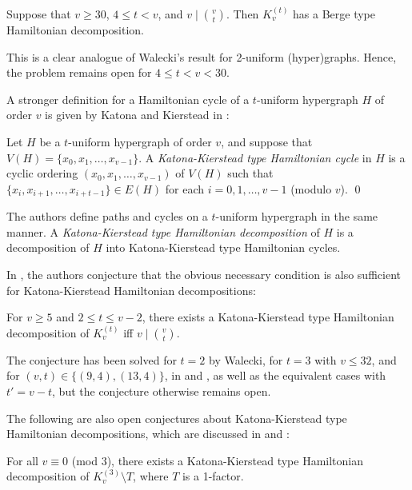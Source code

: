 \begin{theorem} \label{berge-hamilton2}
Suppose that $v \geq 30$, $4 \leq t < v$, and $v \mid {v \choose t}$. Then
$K_v^{(t)}$ has a Berge type Hamiltonian decomposition.
\end{theorem}

This is a clear analogue of Walecki's result for 2-uniform (hyper)graphs.
Hence, the problem remains open for $4 \leq t < v < 30$.

A stronger definition for a Hamiltonian cycle of a $t$-uniform hypergraph $H$ of
order $v$ is given by Katona and Kierstead in \cite{kato-kier}:

\begin{definition}
Let $H$ be a $t$-uniform hypergraph of order $v$, and suppose that $V(H) =
\{x_0, x_1, \ldots, x_{v-1}\}$.
A {\em Katona-Kierstead type Hamiltonian cycle} in $H$ is a cyclic ordering
$(x_0, x_1, \ldots, x_{v-1})$ of $V(H)$
such that $\{x_i, x_{i+1}, \ldots, x_{i+t-1}\} \in E(H)$ for each $i =
0,1,\ldots,v-1$ (modulo $v$).
\qed
\end{definition}

The authors define paths and cycles on a $t$-uniform hypergraph in the same
manner.
A \emph{Katona-Kierstead type Hamiltonian decomposition} of $H$ is a decomposition of
$H$ into Katona-Kierstead type Hamiltonian cycles.

In \cite{bail-stev}, the authors conjecture that the obvious necessary
condition is also sufficient for Katona-Kierstead Hamiltonian decompositions:

\begin{conjecture} \label{bailey-stevens}
For $v \geq 5$ and $2 \leq t \leq v-2$, there exists a Katona-Kierstead type
Hamiltonian decomposition of $K_{v}^{(t)}$ iff $v \mid {v \choose t}$.
\end{conjecture}

The conjecture has been solved for $t = 2$ by Walecki, for $t=3$ with $v \leq
32$, and for $(v, t) \in \{(9,4),(13,4)\}$, in \cite{bail-stev} and
\cite{mesz-rosa}, as well as the equivalent cases with $t' = v-t$, but
the conjecture otherwise remains open.

The following are also open conjectures about Katona-Kierstead type Hamiltonian decompositions, which are discussed in \cite{mesz-rosa} and
\cite{kuhl-schr}:

\begin{conjecture}
For all $v \equiv 0$ (mod $3$), there exists a Katona-Kierstead type
Hamiltonian decomposition of $K_v^{(3)} \setminus T$, where $T$ is a 1-factor.
\end{conjecture}

